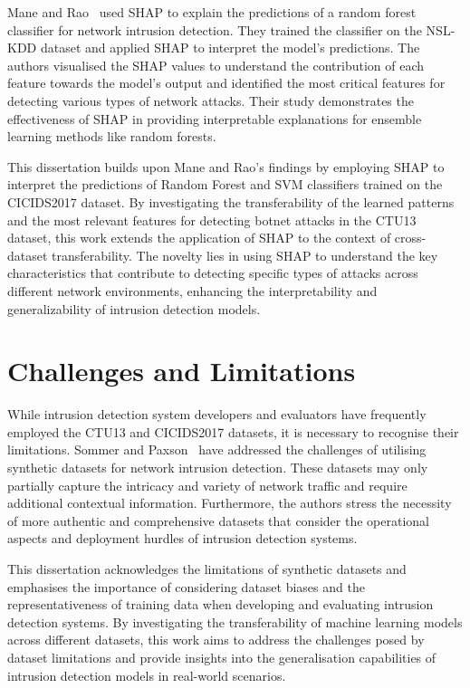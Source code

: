 Mane and Rao~\cite{mane2021explaining} used SHAP to explain the predictions of a random forest classifier for network intrusion detection. They trained the classifier on the NSL-KDD dataset and applied SHAP to interpret the model’s predictions. The authors visualised the SHAP values to understand the contribution of each feature towards the model’s output and identified the most critical features for detecting various types of network attacks. Their study demonstrates the effectiveness of SHAP in providing interpretable explanations for ensemble learning methods like random forests.

This dissertation builds upon Mane and Rao’s findings by employing SHAP to interpret the predictions of Random Forest and SVM classifiers trained on the CICIDS2017 dataset. By investigating the transferability of the learned patterns and the most relevant features for detecting botnet attacks in the CTU13 dataset, this work extends the application of SHAP to the context of cross-dataset transferability. The novelty lies in using SHAP to understand the key characteristics that contribute to detecting specific types of attacks across different network environments, enhancing the interpretability and generalizability of intrusion detection models.

\section{Challenges and Limitations}\label{sec:ChallengesLimitations}

While intrusion detection system developers and evaluators have frequently employed the CTU13 and CICIDS2017 datasets, it is necessary to recognise their limitations. Sommer and Paxson~\cite{sommer2010outside} have addressed the challenges of utilising synthetic datasets for network intrusion detection. These datasets may only partially capture the intricacy and variety of network traffic and require additional contextual information. Furthermore, the authors stress the necessity of more authentic and comprehensive datasets that consider the operational aspects and deployment hurdles of intrusion detection systems.

This dissertation acknowledges the limitations of synthetic datasets and emphasises the importance of considering dataset biases and the representativeness of training data when developing and evaluating intrusion detection systems. By investigating the transferability of machine learning models across different datasets, this work aims to address the challenges posed by dataset limitations and provide insights into the generalisation capabilities of intrusion detection models in real-world scenarios.

